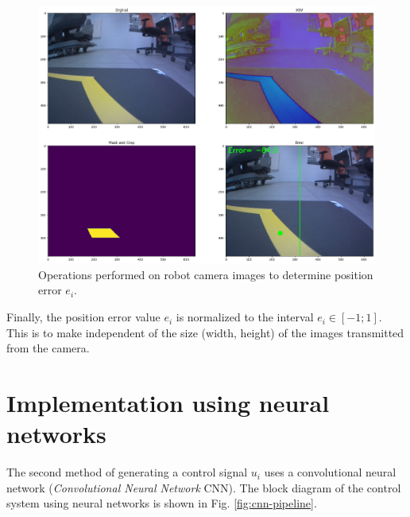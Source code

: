 \documentclass[conference]{IEEEtran}
\begin{document}
\begin{figure}[hbt!]
    \centering
    \includegraphics[width=.95\columnwidth]{img-transformation.png}
    \caption{Operations performed on robot camera images to determine position error  $e_i$.}
    \label{fig:img-transformation-summary}
\end{figure}

Finally, the position error value $e_i$ is normalized to the interval $e_i \in [-1;1]$. This is to make independent of the size (width, height) of the images transmitted from the camera.


\section{Implementation using neural networks}\label{sec:nn-controller}
The second method of generating a control signal $u_i$ uses a convolutional neural network (\emph{Convolutional Neural Network} CNN). The block diagram of the control system using neural networks is shown in Fig. \ref{fig:cnn-pipeline}.
\end{document}
